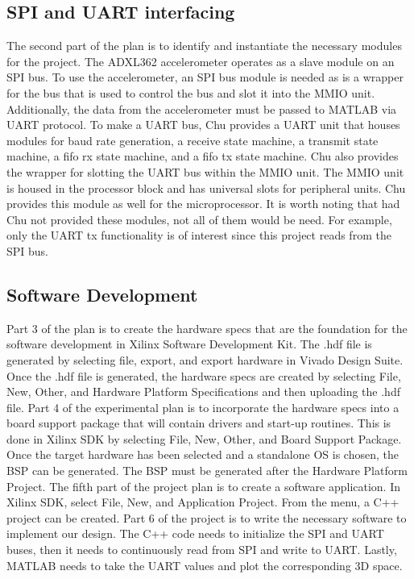 \documentclass{article}
\begin{document}
\subsection{SPI and UART interfacing}
The second part of the plan is to identify and instantiate the necessary modules for the project. The ADXL362 accelerometer operates as a slave module on an SPI bus. To use the accelerometer, an SPI bus module is needed as is a wrapper for the bus that is used to control the bus and slot it into the MMIO unit. Additionally, the data from the accelerometer must be passed to MATLAB via UART protocol. To make a UART bus, Chu provides a UART unit that houses modules for baud rate generation, a receive state machine, a transmit state machine, a fifo rx state machine, and a fifo tx state machine. Chu also provides the wrapper for slotting the UART bus within the MMIO unit. The MMIO unit is housed in the processor block and has universal slots for peripheral units. Chu provides this module as well for the microprocessor. It is worth noting that had Chu not provided these modules, not all of them would be need. For example, only the UART tx functionality is of interest since this project reads from the SPI bus. 
\subsection{Software Development}
Part 3 of the plan is to create the hardware specs that are the foundation for the software development in Xilinx Software Development Kit. The .hdf file is generated by selecting file, export, and export hardware in Vivado Design Suite. Once the .hdf file is generated, the hardware specs are created by selecting File, New, Other, and Hardware Platform Specifications and then uploading the .hdf file. Part 4 of the experimental plan is to incorporate the hardware specs into a board support package that will contain drivers and start-up routines. This is done in Xilinx SDK by selecting File, New, Other, and Board Support Package. Once the target hardware has been selected and a standalone OS is chosen, the BSP can be generated. The BSP must be generated after the Hardware Platform Project. The fifth part of the project plan is to create a software application. In Xilinx SDK, select File, New, and Application Project. From the menu, a C++ project can be created. Part 6 of the project is to write the necessary software to implement our design. The C++ code needs to initialize the SPI and UART buses, then it needs to continuously read from SPI and write to UART. Lastly, MATLAB needs to take the UART values and plot the corresponding 3D space. 
\end{document}
